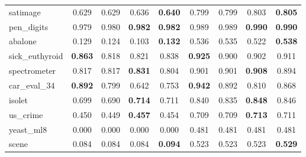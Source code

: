 \begin{figure}[ht]
\begin{tabular}{p{22mm}|*4{p{14mm}}|*4{p{14mm}}}
        satimage&\multicolumn{1}{c}{0.629}&\multicolumn{1}{c}{0.629}&\multicolumn{1}{c}{0.636}&\multicolumn{1}{c|}{\textbf{0.640}}&\multicolumn{1}{c}{0.799}&\multicolumn{1}{c}{0.799}&\multicolumn{1}{c}{0.803}&\multicolumn{1}{c}{\textbf{0.805}}\\
        pen\_digits&\multicolumn{1}{c}{0.979}&\multicolumn{1}{c}{0.980}&\multicolumn{1}{c}{\textbf{0.982}}&\multicolumn{1}{c|}{\textbf{0.982}}&\multicolumn{1}{c}{0.989}&\multicolumn{1}{c}{0.989}&\multicolumn{1}{c}{\textbf{0.990}}&\multicolumn{1}{c}{\textbf{0.990}}\\
        abalone&\multicolumn{1}{c}{0.129}&\multicolumn{1}{c}{0.124}&\multicolumn{1}{c}{0.103}&\multicolumn{1}{c|}{\textbf{0.132}}&\multicolumn{1}{c}{0.536}&\multicolumn{1}{c}{0.535}&\multicolumn{1}{c}{0.522}&\multicolumn{1}{c}{\textbf{0.538}}\\
        sick\_euthyroid&\multicolumn{1}{c}{\textbf{0.863}}&\multicolumn{1}{c}{0.818}&\multicolumn{1}{c}{0.821}&\multicolumn{1}{c|}{0.838}&\multicolumn{1}{c}{\textbf{0.925}}&\multicolumn{1}{c}{0.900}&\multicolumn{1}{c}{0.902}&\multicolumn{1}{c}{0.911}\\
        spectrometer&\multicolumn{1}{c}{0.817}&\multicolumn{1}{c}{0.817}&\multicolumn{1}{c}{\textbf{0.831}}&\multicolumn{1}{c|}{0.804}&\multicolumn{1}{c}{0.901}&\multicolumn{1}{c}{0.901}&\multicolumn{1}{c}{\textbf{0.908}}&\multicolumn{1}{c}{0.894}\\
        car\_eval\_34&\multicolumn{1}{c}{\textbf{0.892}}&\multicolumn{1}{c}{0.799}&\multicolumn{1}{c}{0.642}&\multicolumn{1}{c|}{0.753}&\multicolumn{1}{c}{\textbf{0.942}}&\multicolumn{1}{c}{0.892}&\multicolumn{1}{c}{0.810}&\multicolumn{1}{c}{0.868}\\
        isolet&\multicolumn{1}{c}{0.699}&\multicolumn{1}{c}{0.690}&\multicolumn{1}{c}{\textbf{0.714}}&\multicolumn{1}{c|}{0.711}&\multicolumn{1}{c}{0.840}&\multicolumn{1}{c}{0.835}&\multicolumn{1}{c}{\textbf{0.848}}&\multicolumn{1}{c}{0.846}\\
        us\_crime&\multicolumn{1}{c}{0.450}&\multicolumn{1}{c}{0.449}&\multicolumn{1}{c}{\textbf{0.457}}&\multicolumn{1}{c|}{0.454}&\multicolumn{1}{c}{0.709}&\multicolumn{1}{c}{0.709}&\multicolumn{1}{c}{\textbf{0.713}}&\multicolumn{1}{c}{0.711}\\
        yeast\_ml8&\multicolumn{1}{c}{0.000}&\multicolumn{1}{c}{0.000}&\multicolumn{1}{c}{0.000}&\multicolumn{1}{c|}{0.000}&\multicolumn{1}{c}{0.481}&\multicolumn{1}{c}{0.481}&\multicolumn{1}{c}{0.481}&\multicolumn{1}{c}{0.481}\\
        scene&\multicolumn{1}{c}{0.084}&\multicolumn{1}{c}{0.084}&\multicolumn{1}{c}{0.084}&\multicolumn{1}{c|}{\textbf{0.094}}&\multicolumn{1}{c}{0.523}&\multicolumn{1}{c}{0.523}&\multicolumn{1}{c}{0.523}&\multicolumn{1}{c}{\textbf{0.529}}\\

\end{tabular}
\end{figure}
